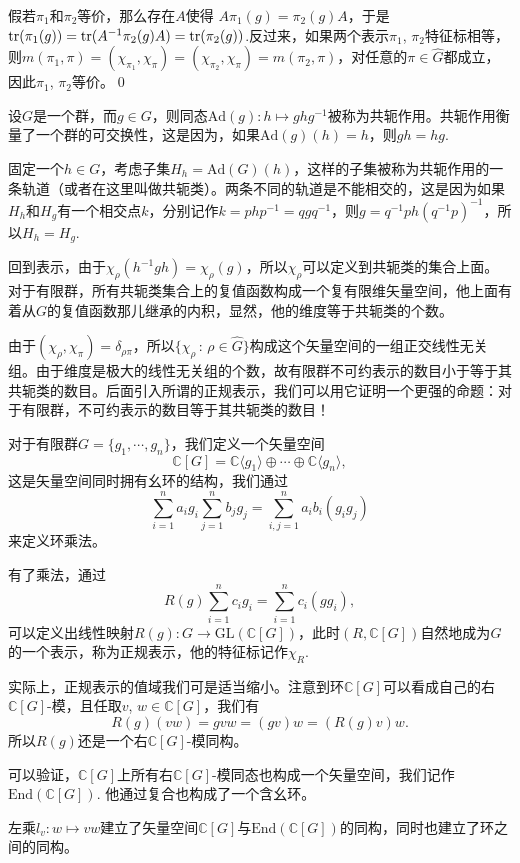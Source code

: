 \documentclass[10pt]{article}
\newcommand{\cc}{\mathbb{C}}
\begin{document}
\proof 假若$\pi_1$和$\pi_2$等价，那么存在$A$使得
$A\pi_1(g)=\pi_2(g)A$，于是$\operatorname{tr}(\pi_1(g))=\operatorname{tr}(A^{-1}\pi_2(g)A)=\operatorname{tr}(\pi_2(g))$.反过来，如果两个表示$\pi_1$, $\pi_2$特征标相等，则$	m(\pi_1,\pi)=(\chi_{\pi_1},\chi_\pi)=(\chi_{\pi_2},\chi_\pi)=m(\pi_2,\pi)$，对任意的$\pi\in\hat{G}$都成立，因此$\pi_1$, $\pi_2$等价。\qed

\para 设$G$是一个群，而$g\in G$，则同态$\mathrm{Ad}(g):h\mapsto ghg^{-1}$被称为共轭作用。共轭作用衡量了一个群的可交换性，这是因为，如果$\mathrm{Ad}(g)(h)=h$，则$gh=hg$.

固定一个$h\in G$，考虑子集$H_h=\mathrm{Ad}(G)(h)$，这样的子集被称为共轭作用的一条轨道（或者在这里叫做共轭类）。两条不同的轨道是不能相交的，这是因为如果$H_h$和$H_g$有一个相交点$k$，分别记作$k=php^{-1}=qgq^{-1}$，则$g=q^{-1}ph(q^{-1}p)^{-1}$，所以$H_h=H_g$.

\para 回到表示，由于$\chi_\rho(h^{-1}gh)= \chi_\rho(g)$，所以$\chi_\rho$可以定义到共轭类的集合上面。对于有限群，所有共轭类集合上的复值函数构成一个复有限维矢量空间，他上面有着从$G$的复值函数那儿继承的内积，显然，他的维度等于共轭类的个数。

由于$(\chi_\rho,\chi_\pi)=\delta_{\rho\pi}$，所以$\{\chi_\rho\,:\, \rho\in \hat{G}\}$构成这个矢量空间的一组正交线性无关组。由于维度是极大的线性无关组的个数，故有限群不可约表示的数目小于等于其共轭类的数目。后面引入所谓的正规表示，我们可以用它证明一个更强的命题：对于有限群，不可约表示的数目等于其共轭类的数目！

\para 对于有限群$G=\{g_1,\cdots,g_n\}$，我们定义一个矢量空间
\[
	\cc [G]=\cc\langle g_1\rangle \oplus \cdots \oplus \cc\langle g_n\rangle,
\]
这是矢量空间同时拥有幺环的结构，我们通过
\[
\sum_{i=1}^n a_i g_i\sum_{j=1}^n b_j g_j=\sum_{i,j=1}^n a_ib_i(g_ig_j)
\]
来定义环乘法。

有了乘法，通过
\[
	R(g)\sum_{i=1}^n c_i g_i=\sum_{i=1}^n c_i(gg_i),
\]
可以定义出线性映射$R(g):G\to \mathrm{GL}(\cc [G])$，此时$(R,\cc [G])$自然地成为$G$的一个表示，称为正规表示，他的特征标记作$\chi_R$. 

实际上，正规表示的值域我们可是适当缩小。注意到环$\cc [G]$可以看成自己的右$\cc [G]$-模，且任取$v$, $w\in \cc [G]$，我们有
\[
	R(g)(vw)=gvw=(gv)w=(R(g)v)w.
\]
所以$R(g)$还是一个右$\cc [G]$-模同构。

可以验证，$\cc [G]$上所有右$\cc [G]$-模同态也构成一个矢量空间，我们记作$\mathrm{End}(\cc [G])$. 他通过复合也构成了一个含幺环。

\pro 左乘$l_v:w\mapsto vw$建立了矢量空间$\cc [G]$与$\mathrm{End}(\cc [G])$的同构，同时也建立了环之间的同构。
\end{document}
